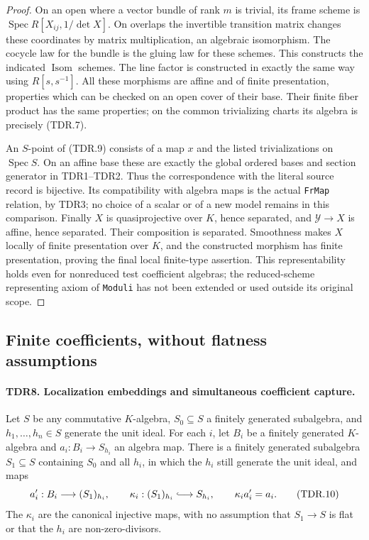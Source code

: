 \documentclass[11pt,a4paper]{article}
\numberwithin{equation}{section}
\theoremstyle{remark}\newtheorem{remark}[theorem]{Remark}
\begin{document}
\begin{proof}
On an open where a vector bundle of rank \(m\) is trivial,
its frame scheme is \(\operatorname{Spec}R[X_{ij},1/\det X]\).
On overlaps the invertible transition matrix changes these
coordinates by matrix multiplication, an algebraic isomorphism.
The cocycle law for the bundle is the gluing law for these schemes.
This constructs the indicated \(\operatorname{Isom}\) schemes.
The line factor is constructed in exactly the same way using
\(R[s,s^{-1}]\).  All these morphisms are affine and of finite
presentation, properties which can be checked on an open cover
of their base.  Their finite fiber product has the same properties;
on the common trivializing charts its algebra is precisely (TDR.7).

An \(S\)-point of (TDR.9) consists of a map \(x\) and the
listed trivializations on \(\operatorname{Spec}S\).  On an
affine base these are exactly the global ordered bases and
section generator in TDR1--TDR2.  Thus the correspondence with
the literal source record is bijective.  Its compatibility with
algebra maps is the actual \texttt{Fr\allowbreak Map} relation, by TDR3;
no choice of a scalar or of a new model remains in this comparison.
Finally \(X\) is quasiprojective over \(K\), hence separated,
and \(\mathcal Y\to X\) is affine, hence separated.  Their
composition is separated.  Smoothness makes \(X\) locally of
finite presentation over \(K\), and the constructed morphism
has finite presentation, proving the final local finite-type
assertion.  This representability holds even for nonreduced
test coefficient algebras; the reduced-scheme representing
axiom of \texttt{Moduli} has not been extended or used outside
its original scope.
\end{proof}

\subsection{Finite coefficients, without flatness assumptions}

\paragraph{TDR8. Localization embeddings and simultaneous coefficient capture.}
\label{claim:TDR8}
Let \(S\) be any commutative \(K\)-algebra,
\(S_0\subseteq S\) a finitely generated subalgebra, and
\(h_1,\ldots,h_n\in S\) generate the unit ideal.
For each \(i\), let \(B_i\) be a finitely generated
\(K\)-algebra and \(a_i:B_i\to S_{h_i}\) an algebra map.
There is a finitely generated subalgebra \(S_1\subseteq S\)
containing \(S_0\) and all \(h_i\), in which the \(h_i\)
still generate the unit ideal, and maps
\[
 a_i':B_i\longrightarrow (S_1)_{h_i},\qquad
 \kappa_i:(S_1)_{h_i}\lhook\joinrel\longrightarrow S_{h_i},
 \qquad \kappa_i a_i'=a_i.                                  \tag{TDR.10}
\]
The \(\kappa_i\) are the canonical injective maps, with no
assumption that \(S_1\to S\) is flat or that the \(h_i\)
are non-zero-divisors.
\end{document}
